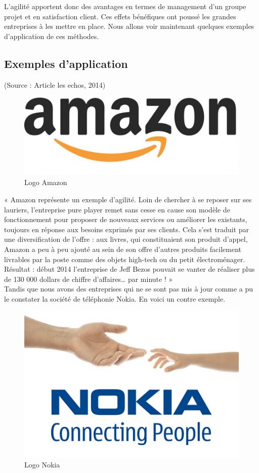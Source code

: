 \documentclass[12pt,a4paper]{article}
\begin{document}
L'agilité apportent donc des avantages en termes de management d’un groupe projet et en satisfaction client. Ces effets bénéfiques ont poussé les grandes entreprises à les mettre en place. Nous allons voir maintenant quelques exemples d’application de ces méthodes.
\newpage
\subsection{Exemples d’application} 
(Source : Article les echos, 2014)

\begin{figure}[h!]
\centering
\includegraphics[scale=0.2]{"amazon-com-logo"}
\caption{Logo Amazon}
\label{fig:amazon}
\end{figure}

« Amazon représente un exemple d'agilité. Loin de chercher à se reposer sur ses lauriers, l'entreprise pure player remet sans cesse en cause son modèle de fonctionnement pour proposer de nouveaux services ou améliorer les existants, toujours en réponse aux besoins exprimés par ses clients.
Cela s'est traduit par une diversification de l'offre : aux livres, qui constituaient son produit d'appel, Amazon a peu à peu ajouté au sein de son offre d'autres produits facilement livrables par la poste comme des objets high-tech ou du petit électroménager. Résultat : début 2014 l'entreprise de Jeff Bezos pouvait se vanter de réaliser plus de 130 000 dollars de chiffre d'affaires… par minute ! »
\\

Tandis que nous avons des entreprises qui ne se sont pas mis à jour comme a pu le constater la société de téléphonie Nokia. En voici un contre exemple.\\


\begin{figure}[h!]
\centering
\includegraphics[scale=0.4]{"nokia-logo1"}
\caption{Logo Nokia}
\label{fig:nokia}
\end{figure}
\end{document}
